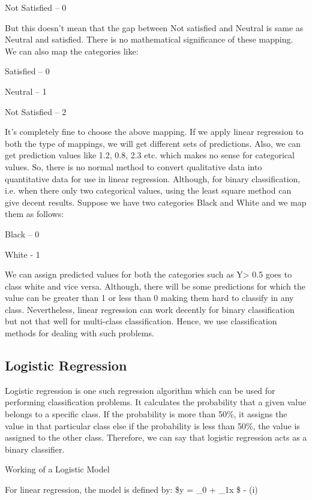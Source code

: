 \documentclass[11pt]{article}
\begin{document}
Not Satisfied -- 0

But this doesn't mean that the gap between Not satisfied and Neutral is
same as Neutral and satisfied. There is no mathematical significance of
these mapping. We can also map the categories like:

Satisfied -- 0

Neutral -- 1

Not Satisfied -- 2

It's completely fine to choose the above mapping. If we apply linear
regression to both the type of mappings, we will get different sets of
predictions. Also, we can get prediction values like 1.2, 0.8, 2.3 etc.
which makes no sense for categorical values. So, there is no normal
method to convert qualitative data into quantitative data for use in
linear regression. Although, for binary classification, i.e. when there
only two categorical values, using the least square method can give
decent results. Suppose we have two categories Black and White and we
map them as follows:

Black -- 0

White - 1

We can assign predicted values for both the categories such as
Y\textgreater{} 0.5 goes to class white and vice versa. Although, there
will be some predictions for which the value can be greater than 1 or
less than 0 making them hard to classify in any class. Nevertheless,
linear regression can work decently for binary classification but not
that well for multi-class classification. Hence, we use classification
methods for dealing with such problems.

    \subsection{Logistic Regression}\label{logistic-regression}

Logistic regression is one such regression algorithm which can be used
for performing classification problems. It calculates the probability
that a given value belongs to a specific class. If the probability is
more than 50\%, it assigns the value in that particular class else if
the probability is less than 50\%, the value is assigned to the other
class. Therefore, we can say that logistic regression acts as a binary
classifier.

Working of a Logistic Model

For linear regression, the model is defined by: \$y = \beta\_0 +
\beta\_1x \$ - (i)
\end{document}
